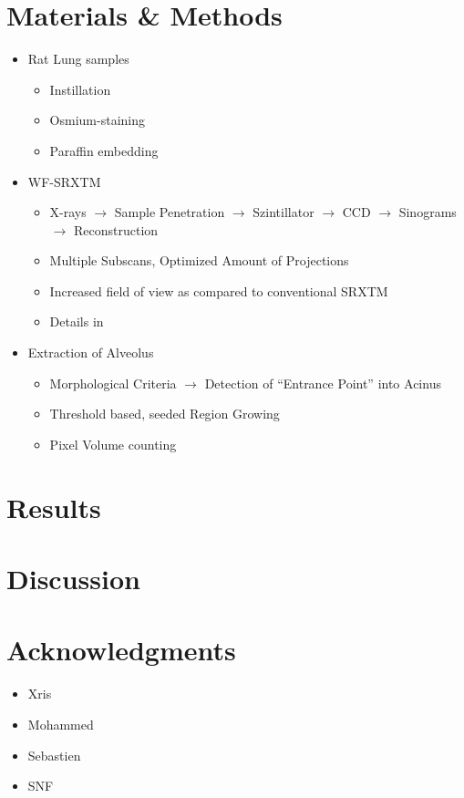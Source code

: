 \documentclass[a4paper,DIC=calc,twoside,abstract=true]{scrartcl}
\begin{document}
\section{Materials \& Methods}\label{sec:MM}
\begin{itemize}
	\item Rat Lung samples
	\begin{itemize}
		\item Instillation
		\item Osmium-staining
		\item Paraffin embedding
	\end{itemize}
	\item WF-SRXTM
	\begin{itemize}
		\item X-rays $\rightarrow$ Sample Penetration $\rightarrow$ Szintillator $\rightarrow$ CCD $\rightarrow$ Sinograms $\rightarrow$ Reconstruction
		\item Multiple Subscans, Optimized Amount of Projections
		\item Increased field of view as compared to conventional SRXTM
		\item Details in~\cite{Haberthuer2010}
	\end{itemize}
	\item Extraction of Alveolus
	\begin{itemize}
		\item Morphological Criteria $\rightarrow$ Detection of ``Entrance Point'' into Acinus
		\item Threshold based, seeded Region Growing
		\item Pixel Volume counting
	\end{itemize}	
\end{itemize}

\section{Results}\label{sec:Results}

\section{Discussion}\label{sec:Discussion}

\section{Acknowledgments}
\begin{itemize}
	\item Xris
	\item Mohammed
	\item Sebastien
	\item SNF
\end{itemize}


 
\end{document}
